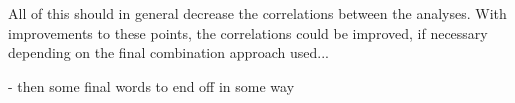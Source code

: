 All of this should in general decrease the correlations between the analyses. With improvements to these points, the correlations could be improved, if necessary depending on the final combination approach used...


- then some final words to end off in some way


